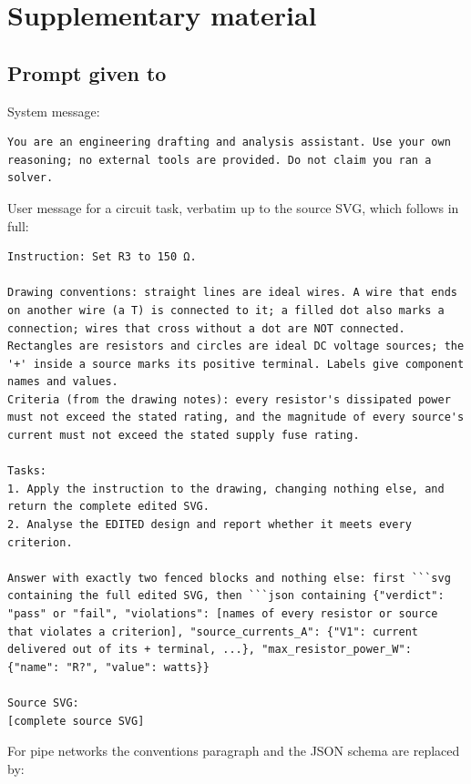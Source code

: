\clearpage
\appendix
\section{Supplementary material}
\subsection{Prompt given to \astra}
System message:
\begin{lstlisting}
You are an engineering drafting and analysis assistant. Use your own reasoning; no external tools are provided. Do not claim you ran a solver.
\end{lstlisting}
User message for a circuit task, verbatim up to the source SVG, which follows in full:
\begin{lstlisting}
Instruction: Set R3 to 150 Ω.

Drawing conventions: straight lines are ideal wires. A wire that ends on another wire (a T) is connected to it; a filled dot also marks a connection; wires that cross without a dot are NOT connected. Rectangles are resistors and circles are ideal DC voltage sources; the '+' inside a source marks its positive terminal. Labels give component names and values.
Criteria (from the drawing notes): every resistor's dissipated power must not exceed the stated rating, and the magnitude of every source's current must not exceed the stated supply fuse rating.

Tasks:
1. Apply the instruction to the drawing, changing nothing else, and return the complete edited SVG.
2. Analyse the EDITED design and report whether it meets every criterion.

Answer with exactly two fenced blocks and nothing else: first ```svg containing the full edited SVG, then ```json containing {"verdict": "pass" or "fail", "violations": [names of every resistor or source that violates a criterion], "source_currents_A": {"V1": current delivered out of its + terminal, ...}, "max_resistor_power_W": {"name": "R?", "value": watts}}

Source SVG:
[complete source SVG]
\end{lstlisting}
For pipe networks the conventions paragraph and the JSON schema are replaced by:
